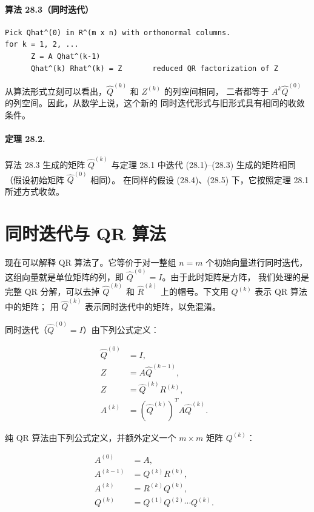 \documentclass[UTF8,fontset=none,12pt]{ctexart}
\begin{document}
\paragraph{算法 28.3（同时迭代）}
\begin{verbatim}
Pick Qhat^(0) in R^(m x n) with orthonormal columns.
for k = 1, 2, ...
      Z = A Qhat^(k-1)
      Qhat^(k) Rhat^(k) = Z       reduced QR factorization of Z
\end{verbatim}

从算法形式立刻可以看出，$\widehat Q^{(k)}$ 和 $Z^{(k)}$ 的列空间相同，
二者都等于 $A^k\widehat Q^{(0)}$ 的列空间。因此，从数学上说，这个新的
同时迭代形式与旧形式具有相同的收敛条件。

\paragraph{定理 28.2.}
算法 28.3 生成的矩阵 $\widehat Q^{(k)}$ 与定理 28.1 中迭代
(28.1)–(28.3) 生成的矩阵相同（假设初始矩阵 $\widehat Q^{(0)}$ 相同）。
在同样的假设 (28.4)、(28.5) 下，它按照定理 28.1 所述方式收敛。

\section*{同时迭代与 QR 算法}

现在可以解释 QR 算法了。它等价于对一整组 $n=m$ 个初始向量进行同时迭代，
这组向量就是单位矩阵的列，即 $\widehat Q^{(0)}=I$。由于此时矩阵是方阵，
我们处理的是完整 QR 分解，可以去掉 $\widehat Q^{(k)}$ 和
$\widehat R^{(k)}$ 上的帽号。下文用 $Q^{(k)}$ 表示 QR 算法中的矩阵；
用 $\widehat Q^{(k)}$ 表示同时迭代中的矩阵，以免混淆。

同时迭代（$\widehat Q^{(0)}=I$）由下列公式定义：

\begin{align}
 \widehat Q^{(0)}&=I, &\tag{28.7}\\
 Z&=A\widehat Q^{(k-1)}, &\tag{28.8}\\
 Z&=\widehat Q^{(k)}R^{(k)}, &\tag{28.9}\\
 A^{(k)}&=(\widehat Q^{(k)})^TA\widehat Q^{(k)}. &\tag{28.10}
\end{align}

纯 QR 算法由下列公式定义，并额外定义一个 $m\times m$ 矩阵 $Q^{(k)}$：

\begin{align}
 A^{(0)}&=A, &\tag{28.11}\\
 A^{(k-1)}&=Q^{(k)}R^{(k)}, &\tag{28.12}\\
 A^{(k)}&=R^{(k)}Q^{(k)}, &\tag{28.13}\\
 Q^{(k)}&=Q^{(1)}Q^{(2)}\cdots Q^{(k)}. &\tag{28.14}
\end{align}
\end{document}
